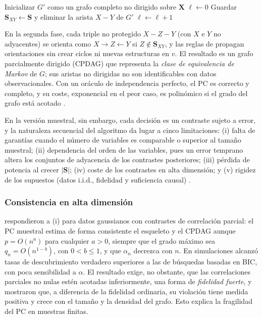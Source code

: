 \begin{algorithm}[H]
\caption{Algoritmo PC: fase de búsqueda del esqueleto}
\label{alg:pc_skeleton}
\begin{algorithmic}[1]
\State Inicializar $G'$ como un grafo completo no dirigido sobre $\mathbf{X}$
\State $\ell \gets 0$
\Repeat
            \State Guardar $\mathbf{S}_{XY} \gets \mathbf{S}$ y eliminar la arista $X - Y$ de $G'$
        \EndIf
    \EndFor
    \State $\ell \gets \ell + 1$
\end{algorithmic}
\end{algorithm}

En la segunda fase, cada triple no protegido $X - Z - Y$ (con $X$ e $Y$ no adyacentes) se orienta como $X \rightarrow Z \leftarrow Y$ si $Z \notin \mathbf{S}_{XY}$, y las reglas de \citet{meek1995causal} propagan orientaciones sin crear ciclos ni nuevas estructuras en $v$. El resultado es un grafo parcialmente dirigido (CPDAG) que representa la \emph{clase de equivalencia de Markov} de $G$; sus aristas no dirigidas no son identificables con datos observacionales. Con un oráculo de independencia perfecto, el PC es correcto y completo, y su coste, exponencial en el peor caso, es polinómico si el grado del grafo está acotado \citep{spirtes2000causation, scanagatta2019survey}.

En la versión muestral, sin embargo, cada decisión es un contraste sujeto a error, y la naturaleza secuencial del algoritmo da lugar a cinco limitaciones: (i) falta de garantías cuando el número de variables es comparable o superior al tamaño muestral; (ii) dependencia del orden de las variables, pues un error temprano altera los conjuntos de adyacencia de los contrastes posteriores; (iii) pérdida de potencia al crecer $|\mathbf{S}|$; (iv) coste de los contrastes en alta dimensión; y (v) rigidez de los supuestos (datos i.i.d., fidelidad y suficiencia causal) \citep{colombo2014order, kalisch2007estimating}.

\subsubsection{Consistencia en alta dimensión}
\citet{kalisch2007estimating} respondieron a (i) para datos gaussianos con contrastes de correlación parcial: el PC muestral estima de forma consistente el esqueleto y el CPDAG aunque $p = O(n^a)$ para cualquier $a > 0$, siempre que el grado máximo sea $q_n = O(n^{1-b})$, con $0 < b \le 1$, y que $\alpha_n$ decrezca con $n$. En simulaciones alcanzó tasas de descubrimiento verdadero superiores a las de búsquedas basadas en BIC, con poca sensibilidad a $\alpha$. El resultado exige, no obstante, que las correlaciones parciales no nulas estén acotadas inferiormente, una forma de \emph{fidelidad fuerte}, y \citet{uhler2013geometry} mostraron que, a diferencia de la fidelidad ordinaria, su violación tiene medida positiva y crece con el tamaño y la densidad del grafo. Esto explica la fragilidad del PC en muestras finitas.


